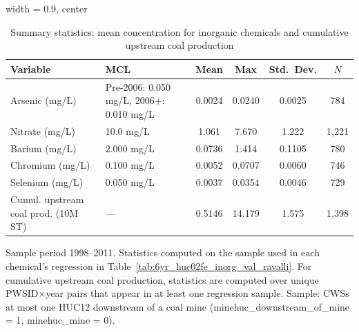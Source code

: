 
\begin{table}[htbp]
   \caption{\label{tab:6yr_huc02fe_inorg_val_sumstats_ravalli} Summary statistics: mean concentration for inorganic chemicals and cumulative upstream coal production}
   \bigskip
   \centering
   \begin{adjustbox}{width = 0.9\textwidth, center}
      \begin{tabular}{lp{3.8cm}cccc}
         \toprule
         Variable & MCL & Mean & Max & Std.\ Dev. & $N$ \\
         \midrule
         Arsenic (mg/L) & Pre-2006: 0.050 mg/L, 2006+: 0.010 mg/L & 0.0024 & 0.0240 & 0.0025 & 784 \\
         Nitrate (mg/L) & 10.0 mg/L & 1.061 & 7.670 & 1.222 & 1,221 \\
         Barium (mg/L) & 2.000 mg/L & 0.0736 & 1.414 & 0.1105 & 780 \\
         Chromium (mg/L) & 0.100 mg/L & 0.0052 & 0.0707 & 0.0060 & 746 \\
         Selenium (mg/L) & 0.050 mg/L & 0.0037 & 0.0354 & 0.0046 & 729 \\
         Cumul. upstream coal prod. (10M ST) & --- & 0.5146 & 14.179 & 1.575 & 1,398 \\
         \bottomrule
      \end{tabular}
   \end{adjustbox}
   {\tiny\linespread{1}\selectfont \par \raggedright Sample period 1998--2011. Statistics computed on the sample used in each chemical's regression in Table~\ref{tab:6yr_huc02fe_inorg_val_ravalli}. For cumulative upstream coal production, statistics are computed over unique PWSID$\times$year pairs that appear in at least one regression sample. Sample: CWSs at most one HUC12 downstream of a coal mine (minehuc\_downstream\_of\_mine = 1, minehuc\_mine = 0).}
\end{table}

